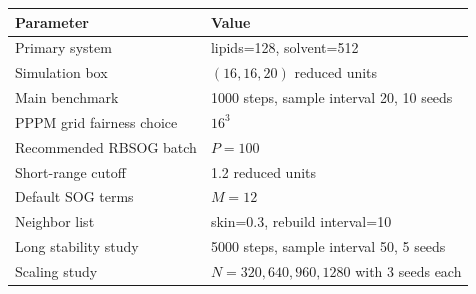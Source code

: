\begin{tabular}{ll}
\toprule
Parameter & Value \\
\midrule
Primary system & lipids=128, solvent=512 \\
Simulation box & $(16, 16, 20)$ reduced units \\
Main benchmark & 1000 steps, sample interval 20, 10 seeds \\
PPPM grid fairness choice & $16^3$ \\
Recommended RBSOG batch & $P=100$ \\
Short-range cutoff & 1.2 reduced units \\
Default SOG terms & $M=12$ \\
Neighbor list & skin=0.3, rebuild interval=10 \\
Long stability study & 5000 steps, sample interval 50, 5 seeds \\
Scaling study & $N=320,640,960,1280$ with 3 seeds each \\
\bottomrule
\end{tabular}
